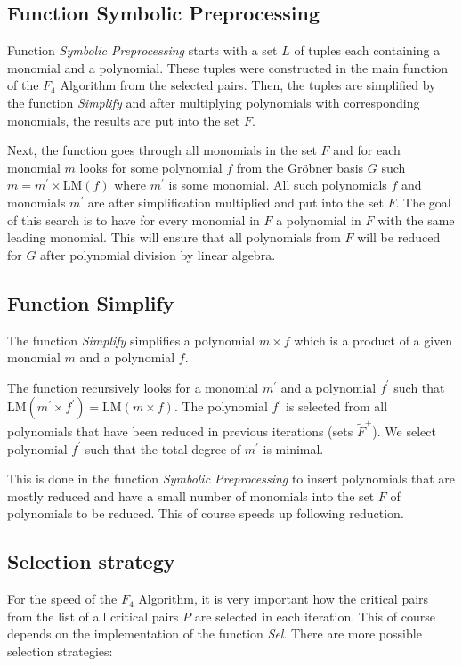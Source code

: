 

\subsection{Function Symbolic Preprocessing}
Function \textit{Symbolic Preprocessing} starts with a set $L$ of tuples each containing a monomial and a polynomial. These tuples were constructed in the main function of the $F_4$ Algorithm from the selected pairs. Then, the tuples are simplified by the function \textit{Simplify} and after multiplying polynomials with corresponding monomials, the results are put into the set $F$.

Next, the function goes through all monomials in the set $F$ and for each monomial $m$ looks for some polynomial $f$ from the Gr\"obner basis $G$ such $m = m^\prime \times \textrm{LM}(f)$ where $m^\prime$ is some monomial. All such polynomials $f$ and monomials $m^\prime$ are after simplification multiplied and put into the set $F$. The goal of this search is to have for every monomial in $F$ a polynomial in $F$ with the same leading monomial. This will ensure that all polynomials from $F$ will be reduced for $G$ after polynomial division by linear algebra.



\subsection{Function Simplify}
The function \textit{Simplify} simplifies a polynomial $m \times f$ which is a product of a given monomial $m$ and a polynomial $f$.

The function recursively looks for a monomial $m^\prime$ and a polynomial $f^\prime$ such that $\textrm{LM}(m^\prime\times f^\prime) = \textrm{LM}(m\times f)$. The polynomial $f^\prime$ is selected from all polynomials that have been reduced in previous iterations (sets $\tilde{F}^+$). We select polynomial $f^\prime$ such that the total degree of $m^\prime$ is minimal.

This is done in the function \textit{Symbolic Preprocessing} to insert polynomials that are mostly reduced and have a small number of monomials into the set $F$ of polynomials to be reduced. This of course speeds up following reduction.



\subsection{Selection strategy}
\label{subsec:F4:sel}
For the speed of the $F_4$ Algorithm, it is very important how the critical pairs from the list of all critical pairs $P$ are selected in each iteration. This of course depends on the implementation of the function \textit{Sel}. There are more possible selection strategies:

